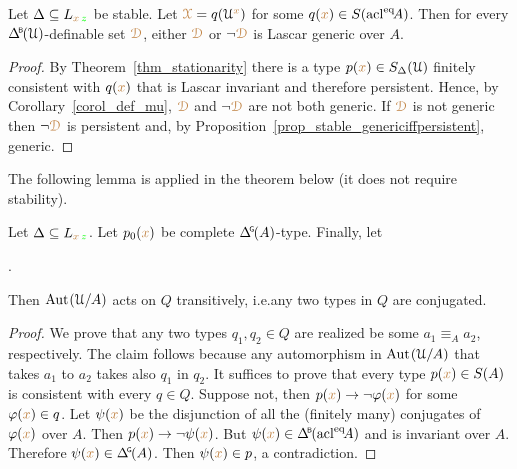 \begin{corollary}\label{corol_stable_generic}
  Let $\Delta\subseteq L_{{\color{brown} x}\,{\color{green} z}}$ be stable.
  Let ${\color{brown}\EuScript X}=q(\EuScript U^{\color{brown} x})$ for some $q({\color{brown} x})\in S({\rm acl}^{{\rm eq}}\!A)$.
  Then for every $\BDelta(\U)$-definable set ${\color{brown}\EuScript D}$, either ${\color{brown}\EuScript D}$ or $\neg{\color{brown}\EuScript D}$ is Lascar generic over $A$.
\end{corollary}

\begin{proof}
  By Theorem~\ref{thm_stationarity} there is a type $p({\color{brown} x})\in S_\Delta(\EuScript U)$ finitely consistent with $q({\color{brown} x})$ that is Lascar invariant and therefore persistent.
  Hence, by Corollary~\ref{corol_def_mu}, ${\color{brown}\EuScript D}$ and $\neg{\color{brown}\EuScript D}$ are not both generic.
  If ${\color{brown}\EuScript D}$ is not generic then $\neg{\color{brown}\EuScript D}$ is persistent and, by Proposition~\ref{prop_stable_genericiffpersistent}, generic.
\end{proof}

The following lemma is applied in the theorem below (it does not require stability).

\begin{lemma}
  Let $\Delta\subseteq L_{{\color{brown} x}\,{\color{green} z}}$.
  Let $p_0({\color{brown} x})$ be complete $\GDelta(A)$-type.
  Finally, let 
  
  .
  
  Then ${\rm Aut\kern.15ex}(\EuScript U/A)$ acts on $Q$ transitively, i.e.\@ any two types in $Q$ are conjugated.
\end{lemma}

\begin{proof}
  We prove that any two types $q_1,q_2\in Q$ are realized be some $a_1\equiv_Aa_2$, respectively.
  The claim follows because any automorphism in ${\rm Aut\kern.15ex}(\EuScript U/A)$ that takes $a_1$ to $a_2$ takes also $q_1$ in $q_2$.
  It suffices to prove that every type $p({\color{brown} x})\in S(A)$ is consistent with every $q\in Q$.
  Suppose not, then $p({\color{brown} x})\rightarrow\neg\varphi({\color{brown} x})$ for some $\varphi({\color{brown} x})\in q$.
  Let $\psi({\color{brown} x})$ be the disjunction of all the (finitely many) conjugates of $\varphi({\color{brown} x})$ over $A$.
  Then $p({\color{brown} x})\rightarrow\neg\psi({\color{brown} x})$.
  But $\psi({\mr x})\in\BDelta(\acl^\eq\!A)$ and is invariant over $A$.
  Therefore $\psi({\mr x})\in\GDelta(A)$.
  Then $\psi({\color{brown} x})\in p$, a contradiction.
\end{proof}

